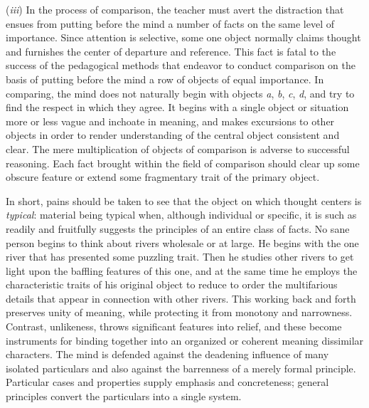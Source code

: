 \documentclass[showtrims,ustradepaper]{memoir}
\begin{document}

(\emph{iii}) In the process of comparison, the teacher must avert the
distraction that ensues from putting before the mind a number of facts
on the same level of importance. Since attention is selective, some one
object normally claims thought and furnishes the center of departure and
reference. This fact is fatal to the success of the pedagogical methods
that endeavor to conduct comparison on the basis of putting before the
mind a row of objects of equal importance. In comparing, the mind does
not naturally begin with objects \emph{a}, \emph{b}, \emph{c}, \emph{d},
and try to find the respect in which they agree. It begins with a single
object or situation more or less vague and inchoate in meaning, and
makes excursions to other objects in order to render understanding of
the central object consistent and clear. The mere multiplication of
objects of comparison is adverse to successful reasoning. Each fact
brought within the field of comparison should clear up some obscure
feature or extend some fragmentary trait of the primary object.


In short, pains should be taken to see that the object on which thought
centers is \emph{typical}: material being typical when, although
individual or specific, it is such as readily and fruitfully suggests
the principles of an
entire
class of facts. No sane person begins to think about rivers wholesale or
at large. He begins with the one river that has presented some puzzling
trait. Then he studies other rivers to get light upon the baffling
features of this one, and at the same time he employs the characteristic
traits of his original object to reduce to order the multifarious
details that appear in connection with other rivers. This working back
and forth preserves unity of meaning, while protecting it from monotony
and narrowness. Contrast, unlikeness, throws significant features into
relief, and these become instruments for binding together into an
organized or coherent meaning dissimilar characters. The mind is
defended against the deadening influence of many isolated particulars
and also against the barrenness of a merely formal principle. Particular
cases and properties supply emphasis and concreteness; general
principles convert the particulars into a single system.

\end{document}
